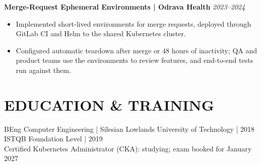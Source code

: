 \documentclass[11pt,a4paper]{article}
\begin{document}
\textbf{Merge-Request Ephemeral Environments | Odrava Health} \hfill \textit{2023–2024}
\begin{itemize}
\item Implemented short-lived environments for merge requests, deployed through GitLab CI and Helm to the shared Kubernetes cluster.
\item Configured automatic teardown after merge or 48 hours of inactivity; QA and product teams use the environments to review features, and end-to-end tests run against them.
\end{itemize}

\section*{EDUCATION \& TRAINING}
BEng Computer Engineering | Silesian Lowlands University of Technology | 2018\\
ISTQB Foundation Level | 2019\\
Certified Kubernetes Administrator (CKA): studying; exam booked for January 2027
\end{document}
